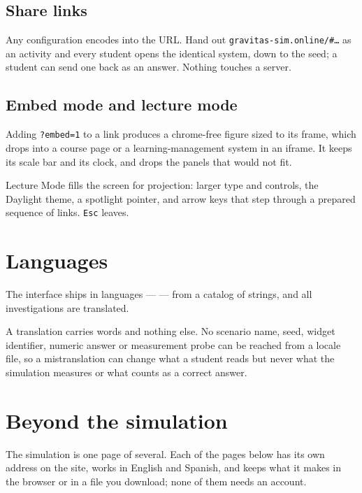 \documentclass[11pt,a4paper]{article}
\newcommand{\ui}[1]{\textsf{#1}}
\newcommand{\key}[1]{\texttt{#1}}
\begin{document}
\subsection{Share links}

Any configuration encodes into the URL. Hand out
\texttt{gravitas-sim.online/\#\dots} as an activity and every student opens the
identical system, down to the seed; a student can send one back as an answer.
Nothing touches a server.

\subsection{Embed mode and lecture mode}

Adding \texttt{?embed=1} to a link produces a chrome-free figure sized to its
frame, which drops into a course page or a learning-management system in an
iframe. It keeps its scale bar and its clock, and drops the panels that would not
fit.

\ui{Lecture Mode} fills the screen for projection: larger type and controls, the
Daylight theme, a spotlight pointer, and arrow keys that step through a prepared
sequence of links. \key{Esc} leaves.

\section{Languages}

The interface ships in \GravLocales{} languages --- \GravLocaleNames{} --- from a
catalog of \GravUiStrings{} strings, and all \GravInvestigations{} investigations
are translated.

A translation carries words and nothing else. No scenario name, seed, widget
identifier, numeric answer or measurement probe can be reached from a locale
file, so a mistranslation can change what a student reads but never what the
simulation measures or what counts as a correct answer.

\section{Beyond the simulation}

The simulation is one page of several. Each of the pages below has its own
address on the site, works in English and Spanish, and keeps what it makes in
the browser or in a file you download; none of them needs an account.
\end{document}
